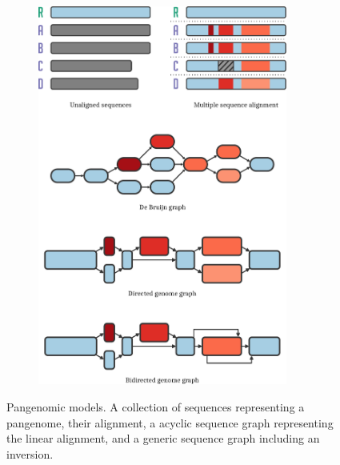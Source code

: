 \begin{figure}[p]
\begin{subfigure}[b]{0.5\textwidth}
    \includegraphics[width=0.9\textwidth]{figures/data_structures.pdf}
    \centering
  \end{subfigure}
  \caption{
    \label{fig:models}
    Pangenomic models.
      A collection of sequences representing a pangenome, their alignment, a acyclic sequence graph representing the linear alignment, and a generic sequence graph including an inversion.
  }

\end{figure}

